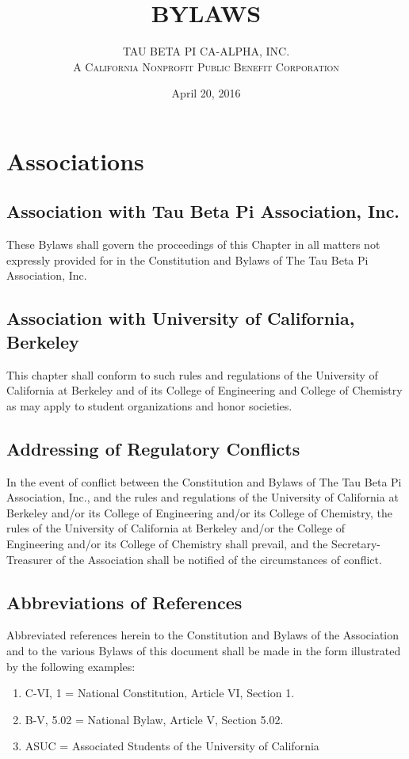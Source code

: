 \documentclass{article}
\begin{document}
	\title{\textbf {\uppercase{Bylaws}}}
	\author{\uppercase{Tau Beta Pi CA-Alpha, Inc.} \\ \textsc{A California Nonprofit Public Benefit Corporation}}
	\date{April 20, 2016}
	\maketitle
	\clearpage


	\section{Associations}
	\subsection{Association with Tau Beta Pi Association, Inc.}
	These Bylaws shall govern the proceedings of this Chapter in all matters not expressly provided for in the Constitution and Bylaws of The Tau Beta Pi Association, Inc.
	\subsection{Association with University of California, Berkeley}
	This chapter shall conform to such rules and regulations of the University of California at Berkeley and of its College of Engineering and College of Chemistry as may apply to student organizations and honor societies.
	\subsection{Addressing of Regulatory Conflicts}
	In the event of conflict between the Constitution and Bylaws of The Tau Beta Pi Association, Inc., and the rules and regulations of the University of California at Berkeley and/or its College of Engineering and/or its College of Chemistry, the rules of the University of California at Berkeley and/or the College of Engineering and/or its College of Chemistry shall prevail, and the Secretary- Treasurer of the Association shall be notified of the circumstances of conflict.
	\subsection{Abbreviations of References}
	Abbreviated references herein to the Constitution and Bylaws of the Association and to the various Bylaws of this document shall be made in the form illustrated by the following examples:
	\begin{enumerate}[\indent a)]
	\item C-VI, 1 = National Constitution, Article VI, Section 1. 
	\item B-V, 5.02 = National Bylaw, Article V, Section 5.02.
	\item ASUC = Associated Students of the University of California 
	\end{enumerate}
	
\end{document}
